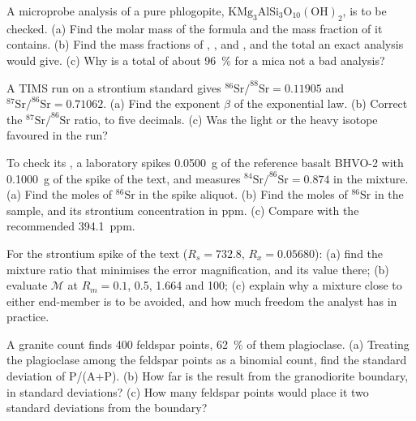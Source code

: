 \begin{exercise}[$\star\star$]\label{exo:b2:field-lab-methods-2:7}
A microprobe analysis of a pure phlogopite, $\mathrm{KMg_3AlSi_3O_{10}(OH)_2}$, is to be checked.
(a) Find the molar mass of the formula and the mass fraction of  it contains. (b) Find the
mass fractions of , ,  and , and the total an exact analysis would
give. (c) Why is a total of about \qty{96}{\percent} for a mica not a bad analysis?
\end{exercise}

\begin{exercise}[$\star\star$]\label{exo:b2:field-lab-methods-2:8}
A TIMS run on a strontium standard gives $^{86}\mathrm{Sr}/^{88}\mathrm{Sr} = 0.11905$ and
$^{87}\mathrm{Sr}/^{86}\mathrm{Sr} = 0.71062$. (a) Find the exponent $\beta$ of the exponential law.
(b) Correct the $^{87}\mathrm{Sr}/^{86}\mathrm{Sr}$ ratio, to five decimals. (c) Was the light or
the heavy isotope favoured in the run?
\end{exercise}

\begin{exercise}[$\star\star$]\label{exo:b2:field-lab-methods-2:9}
To check its , a laboratory spikes \qty{0.0500}{g} of the reference basalt BHVO-2
with \qty{0.1000}{g} of the spike of the text, and measures $^{84}\mathrm{Sr}/^{86}\mathrm{Sr} =
0.874$ in the mixture. (a) Find the moles of $^{86}\mathrm{Sr}$ in the spike aliquot. (b) Find the
moles of $^{86}\mathrm{Sr}$ in the sample, and its strontium concentration in ppm. (c) Compare with
the recommended \qty{394.1}{ppm}.
\end{exercise}

\begin{exercise}[$\star\star\star$]\label{exo:b2:field-lab-methods-2:10}
For the strontium spike of the text ($R_s = 732.8$, $R_x = 0.05680$): (a) find the mixture ratio
that minimises the error magnification, and its value there; (b) evaluate $\mathcal M$ at
$R_m = 0.1$, 0.5, 1.664 and 100; (c) explain why a mixture close to either end-member is to be
avoided, and how much freedom the analyst has in practice.
\end{exercise}

\begin{exercise}[$\star\star\star$]\label{exo:b2:field-lab-methods-2:11}
A granite count finds 400 feldspar points, \qty{62}{\percent} of them plagioclase. (a) Treating the
plagioclase among the feldspar points as a binomial count, find the standard deviation of
P/(A+P). (b) How far is the result from the granodiorite boundary, in standard deviations? (c) How
many feldspar points would place it two standard deviations from the boundary?
\end{exercise}

